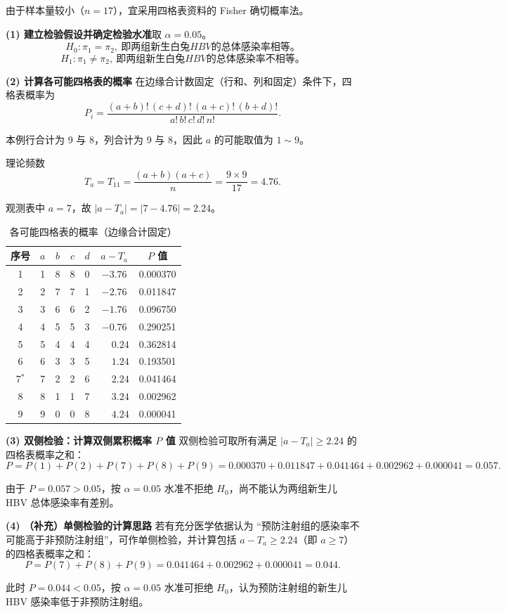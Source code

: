 \documentclass[lang=cn,10pt]{elegantbook}
\begin{document}
\begin{solution}
由于样本量较小（$n=17$），宜采用四格表资料的 Fisher 确切概率法。

\textbf{(1) 建立检验假设并确定检验水准}\quad 取 $\alpha=0.05$。
\[
  H_0:\pi_1=\pi_2,~即两组新生白兔HBV的总体感染率相等。
\]
\[
H_1:\pi_1\ne\pi_2,~即两组新生白兔HBV的总体感染率不相等。
\]

\textbf{(2) 计算各可能四格表的概率}\quad
在边缘合计数固定（行和、列和固定）条件下，四格表概率为
\[
  P_i=\frac{(a+b)!\,(c+d)!\,(a+c)!\,(b+d)!}{a!\,b!\,c!\,d!\,n!}.
\]

本例行合计为 9 与 8，列合计为 9 与 8，因此 $a$ 的可能取值为 $1\sim 9$。

理论频数
\[
  T_a=T_{11}=\frac{(a+b)(a+c)}{n}=\frac{9\times 9}{17}=4.76.
\]

观测表中 $a=7$，故 $|a-T_a|=|7-4.76|=2.24$。

\begin{table}[htbp]
\centering
\caption*{各可能四格表的概率（边缘合计固定）}
\small
\begin{tabular}{ccccccc}
  \hline
  序号 & $a$ & $b$ & $c$ & $d$ & $a-T_a$ & $P$ 值 \\
  \hline
  1 & 1 & 8 & 8 & 0 & $-3.76$ & 0.000370 \\
  2 & 2 & 7 & 7 & 1 & $-2.76$ & 0.011847 \\
  3 & 3 & 6 & 6 & 2 & $-1.76$ & 0.096750 \\
  4 & 4 & 5 & 5 & 3 & $-0.76$ & 0.290251 \\
  5 & 5 & 4 & 4 & 4 & $\phantom{+}0.24$ & 0.362814 \\
  6 & 6 & 3 & 3 & 5 & $\phantom{+}1.24$ & 0.193501 \\
  7$^\ast$ & 7 & 2 & 2 & 6 & $\phantom{+}2.24$ & 0.041464 \\
  8 & 8 & 1 & 1 & 7 & $\phantom{+}3.24$ & 0.002962 \\
  9 & 9 & 0 & 0 & 8 & $\phantom{+}4.24$ & 0.000041 \\
  \hline
\end{tabular}
\end{table}

\textbf{(3) 双侧检验：计算双侧累积概率 $P$ 值}\quad
双侧检验可取所有满足 $|a-T_a|\ge 2.24$ 的四格表概率之和：
\[
  P=P(1)+P(2)+P(7)+P(8)+P(9)
  =0.000370+0.011847+0.041464+0.002962+0.000041=0.057.
\]

由于 $P=0.057>0.05$，按 $\alpha=0.05$ 水准不拒绝 $H_0$，尚不能认为两组新生儿 HBV 总体感染率有差别。

\textbf{(4) （补充）单侧检验的计算思路}\quad
若有充分医学依据认为 ``预防注射组的感染率不可能高于非预防注射组''，可作单侧检验，并计算包括 $a-T_a\ge 2.24$（即 $a\ge 7$）的四格表概率之和：
\[
  P=P(7)+P(8)+P(9)=0.041464+0.002962+0.000041=0.044.
\]

此时 $P=0.044<0.05$，按 $\alpha=0.05$ 水准可拒绝 $H_0$，认为预防注射组的新生儿 HBV 感染率低于非预防注射组。
\end{solution}
\end{document}
